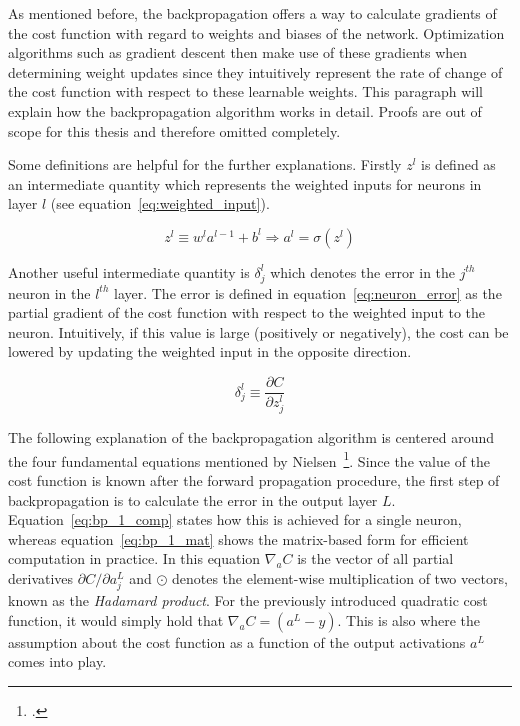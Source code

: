 As mentioned before, the backpropagation offers a way to calculate gradients
of the cost function with regard to weights and biases of the network.
Optimization algorithms such as gradient descent then make use of these 
gradients when determining weight updates since they intuitively represent
the rate of change of the cost function with respect to these learnable weights.
This paragraph will explain how the backpropagation algorithm works in detail.
Proofs are out of scope for this thesis and therefore omitted completely.

Some definitions are helpful for the further explanations. Firstly
$z^l$ is defined as an intermediate quantity which represents the weighted
inputs for neurons in layer $l$ (see equation~\ref{eq:weighted_input}).

\begin{equation}
  \label{eq:weighted_input}
  z^l \equiv w^l a^{l-1} + b^l \Rightarrow a^l = \sigma(z^l)
\end{equation}

Another useful intermediate quantity is $\delta_j^l$ which denotes the error
in the $j^{th}$ neuron in the $l^{th}$ layer. The error is defined in
equation~\ref{eq:neuron_error} as the partial gradient of the cost function
with respect to the weighted input to the neuron. Intuitively, if this value
is large (positively or negatively), the cost can be lowered by updating the 
weighted input in the opposite direction.

\begin{equation}
  \label{eq:neuron_error}
  \delta_j^l \equiv \frac{\partial C}{\partial z_j^l}
\end{equation}

The following explanation of the backpropagation algorithm is centered around
the four fundamental equations mentioned by Nielsen~\footcite{Nielsen2015}.
Since the value of the cost function is known after the forward propagation
procedure, the first step of backpropagation is to calculate the error in the
output layer $L$.
Equation~\ref{eq:bp_1_comp} states how this is achieved for a single neuron,
whereas equation~\ref{eq:bp_1_mat} shows the matrix-based form for efficient
computation in practice. In this equation $\nabla_a C$ is the vector of all partial
derivatives $\partial C / \partial a_j^L$ and $\odot$ denotes the element-wise
multiplication of two vectors, known as the \textit{Hadamard product}.
For the previously introduced quadratic cost function, it would simply hold
that $\nabla_a C = (a^L -y)$.
This is also where the assumption about the cost function as a function of the
output activations $a^L$ comes into play.

